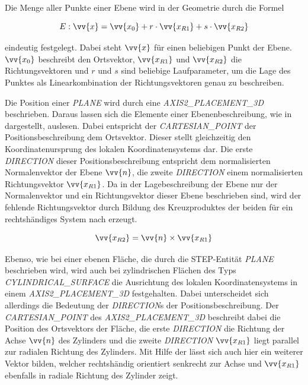 Die Menge aller Punkte einer Ebene wird in der Geometrie durch die Formel

\begin{equation}\label{eq:plane}
E: \vv{x} = \vv{x_{0}} + r \cdot \vv{x_{R1}} + s \cdot \vv{x_{R2}}  
\end{equation}

eindeutig festgelegt. Dabei steht $\vv{x}$ für einen beliebigen Punkt der Ebene. $\vv{x_{0}}$ beschreibt den Ortsvektor, $\vv{x_{R1}}$ und $\vv{x_{R2}}$  die Richtungsvektoren und $r$ und $s$ sind beliebige Laufparameter, um die Lage des Punktes als Linearkombination der Richtungsvektoren genau zu beschreiben.

Die Position einer \textit{PLANE} wird durch eine \textit{AXIS2\_PLACEMENT\_3D} beschrieben. Daraus lassen sich die Elemente einer Ebenenbeschreibung, wie in  dargestellt, auslesen. 
Dabei entspricht der \textit{CARTESIAN\_POINT} der Positionsbeschreibung dem Ortsvektor. Dieser stellt gleichzeitig den Koordinatenursprung des lokalen Koordinatensystems dar. Die erste \textit{DIRECTION} dieser Positionsbeschreibung entspricht dem normalisierten Normalenvektor der Ebene $\vv{n}$, die zweite \textit{DIRECTION} einem normalisierten Richtungsvektor $\vv{x_{R1}}$. Da in der Lagebeschreibung der Ebene nur der Normalenvektor und ein Richtungsvektor dieser Ebene beschrieben sind, wird der fehlende Richtungsvektor durch Bildung des Kreuzproduktes der beiden für ein rechtshändiges System nach  erzeugt.

\begin{equation}\label{eq:crossproduct}
\vv{x_{R2}} = \vv{n} \times \vv{x_{R1}}
\end{equation}  

Ebenso, wie bei einer ebenen Fläche, die durch die STEP-Entität \textit{PLANE} beschrieben wird, wird auch bei zylindrischen Flächen des Typs \textit{CYLINDRICAL\_SURFACE} die Ausrichtung des lokalen Koordinatensystems in einem \textit{AXIS2\_PLACEMENT\_3D} festgehalten. Dabei unterscheidet sich allerdings die Bedeutung der \textit{DIRECTION}s der Positionsbeschreibung. Der \textit{CARTESIAN\_POINT} des \textit{AXIS2\_PLACEMENT\_3D} beschreibt dabei die Position des Ortsvektors der Fläche, die erste \textit{DIRECTION} die Richtung der Achse $\vv{n}$ des Zylinders und die zweite \textit{DIRECTION} $\vv{x_{R1}}$ liegt parallel zur radialen Richtung des Zylinders. Mit Hilfe der  lässt sich auch hier ein weiterer Vektor bilden, welcher rechtshändig orientiert senkrecht zur Achse und $\vv{x_{R1}}$ ebenfalls in radiale Richtung des Zylinder zeigt. 

